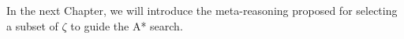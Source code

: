 %
%

In the next Chapter, we will introduce the meta-reasoning proposed for selecting a subset of $\zeta$ to guide the A* search.

\clearpage